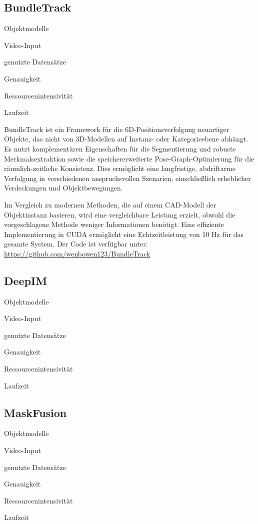\documentclass[a4paper, 11pt]{article}
\begin{document}
\begin{multicols*}{2}
    \subsection{BundleTrack\cite{BundleTrack}}
    \begin{description*}
        \item[Objektmodelle]
        \item[Video-Input]
        \item[genutzte Datensätze]
        \item[Genauigkeit]
        \item[Ressourcenintensivität]
        \item[Laufzeit]
    \end{description*}
    BundleTrack ist ein Framework für die 6D-Positionsverfolgung neuartiger Objekte, das nicht von 3D-Modellen auf Instanz- oder Kategorieebene abhängt. Es nutzt komplementären Eigenschaften für die Segmentierung und robuste Merkmalsextraktion sowie die speichererweiterte Pose-Graph-Optimierung für die räumlich-zeitliche Konsistenz. Dies ermöglicht eine langfristige, abdriftarme Verfolgung in verschiedenen anspruchsvollen Szenarien, einschließlich erheblicher Verdeckungen und Objektbewegungen.

    Im Vergleich zu modernen Methoden, die auf einem CAD-Modell der Objektinstanz basieren, wird eine vergleichbare Leistung erzielt, obwohl die vorgeschlagene Methode weniger Informationen benötigt. Eine effiziente Implementierung in CUDA ermöglicht eine Echtzeitleistung von 10 Hz für das gesamte System.
    Der Code ist verfügbar unter: \href{https://github.com/wenbowen123/BundleTrack}{https://github.com/wenbowen123/BundleTrack}

    \subsection{DeepIM\cite{Deepim}}
    \begin{description*}
        \item[Objektmodelle]
        \item[Video-Input]
        \item[genutzte Datensätze]
        \item[Genauigkeit]
        \item[Ressourcenintensivität]
        \item[Laufzeit]
    \end{description*}

    \subsection{MaskFusion\cite{MaskFusion}}
    \begin{description*}
        \item[Objektmodelle]
        \item[Video-Input]
        \item[genutzte Datensätze]
        \item[Genauigkeit]
        \item[Ressourcenintensivität]
        \item[Laufzeit]
    \end{description*}


\end{multicols*}
\end{document}
